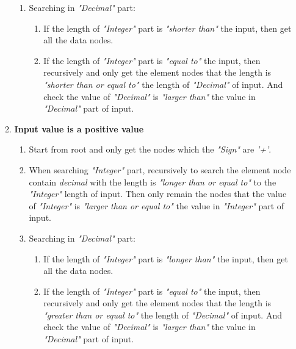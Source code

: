 \begin{enumerate}
\begin{enumerate}
\begin{enumerate}
\item Searching in \textit{"Decimal"} part:
\begin{enumerate}

\item If the length of \textit{"Integer"} part is \textit{"shorter than"} the input, then get all the data nodes.

\item If the length of \textit{"Integer"} part is \textit{"equal to"} the input, then recursively and only get the element nodes that the length is \textit{"shorter than or equal to"} the length of \textit{"Decimal"} of input. And check the value of \textit{"Decimal"} is \textit{"larger than"} the value in \textit{"Decimal"} part of input.
\end{enumerate}

\end{enumerate}

\item \textbf{Input value is a positive value}

\begin{enumerate}

\item Start from root and only get the nodes which the \textit{"Sign"} are \textit{'+'}.

\item When searching \textit{"Integer"} part, recursively to search the element node contain \textit{decimal} with the length is \textit{"longer than or equal to"} to the \textit{"Integer"} length of input. Then only remain the nodes that the value of \textit{"Integer"} is \textit{"larger than or equal to"} the value in \textit{"Integer"} part of input.

\item Searching in \textit{"Decimal"} part:
\begin{enumerate}

\item If the length of \textit{"Integer"} part is \textit{"longer than"} the input, then get all the data nodes.

\item If the length of \textit{"Integer"} part is \textit{"equal to"} the input, then recursively and only get the element nodes that the length is \textit{"greater than or equal to"} the length of \textit{"Decimal"} of input. And check the value of \textit{"Decimal"} is \textit{"larger than"} the value in \textit{"Decimal"} part of input.
\end{enumerate}


\end{enumerate}
\end{enumerate}
\end{enumerate}
